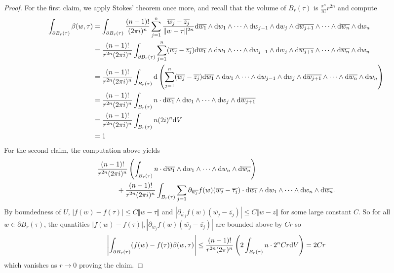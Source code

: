 \begin{proof}
    For the first claim, we apply Stokes' theorem once more, and recall that the volume of $B_{r}(\tau)$ is $\frac{\pi^{n}}{n!}r^{2n}$ and compute 
    \footnotesize
    \begin{align*}
        \int_{\partial B_{r}(\tau)}\beta(w,\tau) &= \int_{\partial B_{r}(\tau)}\frac{(n-1)!}{(2\pi i)^{n}}\sum_{j=1}^{n}\frac{\overline{w_{j}}-\overline{z_{j}}}{\Vert w-\tau\Vert^{2n}}\mathrm{d}\overline{w_{1}}\wedge\mathrm{d} w_{1}\wedge\dots\wedge\mathrm{d} w_{j-1}\wedge\mathrm{d} w_{j}\wedge \mathrm{d}\overline{w_{j+1}}\wedge\dots\wedge\mathrm{d}\overline{w_{n}}\wedge\mathrm{d} w_{n} \\
        &= \frac{(n-1)!}{r^{2n}(2\pi i)^{n}}\int_{\partial B_{r}(\tau)}\sum_{j=1}^{n}(\overline{w_{j}}-\overline{z_{j}})\mathrm{d}\overline{w_{1}}\wedge\mathrm{d} w_{1}\wedge\dots\wedge\mathrm{d} w_{j-1}\wedge\mathrm{d} w_{j}\wedge \mathrm{d}\overline{w_{j+1}}\wedge\dots\wedge\mathrm{d}\overline{w_{n}}\wedge\mathrm{d} w_{n} \\
        &=\frac{(n-1)!}{r^{2n}(2\pi i)^{n}}\int_{B_{r}(\tau)}\mathrm{d}\left(\sum_{j=1}^{n}(\overline{w_{j}}-\overline{z_{j}})\mathrm{d}\overline{w_{1}}\wedge\mathrm{d} w_{1}\wedge\dots\wedge\mathrm{d} w_{j-1}\wedge\mathrm{d} w_{j}\wedge \mathrm{d}\overline{w_{j+1}}\wedge\dots\wedge\mathrm{d}\overline{w_{n}}\wedge\mathrm{d} w_{n}\right) \\
        &= \frac{(n-1)!}{r^{2n}(2\pi i)^{n}}\int_{B_{r}(\tau)}n\cdot\mathrm{d}\overline{w_{1}}\wedge\mathrm{d} w_{1}\wedge\dots\wedge\mathrm{d} w_{j}\wedge \mathrm{d}\overline{w_{j+1}} \\
        &= \frac{(n-1)!}{r^{2n}(2\pi i)^{n}}\int_{B_{r}(\tau)}n(2i)^{n}\mathrm{d} V \\
        &= 1
    \end{align*}
    \large
    For the second claim, the computation above yields
    \footnotesize
    \begin{align*}
        &\frac{(n-1)!}{r^{2n}(2\pi i)^{n}}\left(\int_{B_{r}(\tau)}n\cdot\mathrm{d}\overline{w_{1}}\wedge\mathrm{d} w_{1}\wedge\dots\wedge\mathrm{d} w_{n}\wedge \mathrm{d}\overline{w_{n}}\right)\\
        &\hspace{1cm}+\frac{(n-1)!}{r^{2n}(2\pi i)^{n}}\int_{B_{r}(\tau)}\sum_{j=1}\partial_{\overline{w_{j}}}f(w)(\overline{w_{j}}-\overline{\tau_{j}})\cdot\mathrm{d}\overline{w_{1}}\wedge\mathrm{d} w_{1}\wedge\dots\wedge\mathrm{d} w_{n}\wedge \mathrm{d}\overline{w_{n}}.
    \end{align*}
    \large
    By boundedness of $U$, $|f(w)-f(\tau)|\leq C\Vert w-\tau\Vert$ and $|\partial_{\overline{w_{j}}}f(w)(\overline{w_{j}}-\overline{z_{j}})|\leq C\Vert w-z\Vert$ for some large constant $C$. So for all $w\in\partial B_{r}(\tau)$, the quantities $|f(w)-f(\tau)|,|\partial_{\overline{w_{j}}}f(w)(\overline{w_{j}}-\overline{z_{j}})|$ are bounded above by $Cr$ so 
    $$\left|\int_{\partial B_{r}(\tau)}(f(w)-f(\tau))\beta(w,\tau)\right|\leq\frac{(n-1)!}{r^{2n}(2\pi)^{n}}\left(2\int_{B_{r}(\tau)}n\cdot 2^{n}Cr\mathrm{d} V\right)=2Cr$$
    which vanishes as $r\to0$ proving the claim. 
\end{proof}
